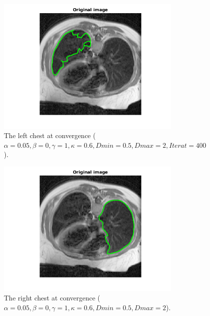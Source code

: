 \documentclass{article}
\begin{document}
\begin{figure}[H]
\centering
\begin{subfigure}{0.49\textwidth}
  \centering
  \includegraphics[width=\linewidth]{chestLeftclassical.png}
  \caption{The left chest at convergence ($\alpha=0.05, \beta=0, \gamma=1,\kappa=0.6,Dmin=0.5,Dmax=2,Iterat=400$).}
  \label{fig4a}
\end{subfigure}
\begin{subfigure}{0.49\textwidth}
  \centering
  \includegraphics[width=\linewidth]{chestRightclassical.png}
  \caption{The right chest at convergence ($\alpha=0.05, \beta=0, \gamma=1,\kappa=0.6,Dmin=0.5,Dmax=2$).}
  \label{fig4b}
\end{subfigure}
\begin{subfigure}{0.49\textwidth}

\end{subfigure}
\end{figure}
\end{document}

